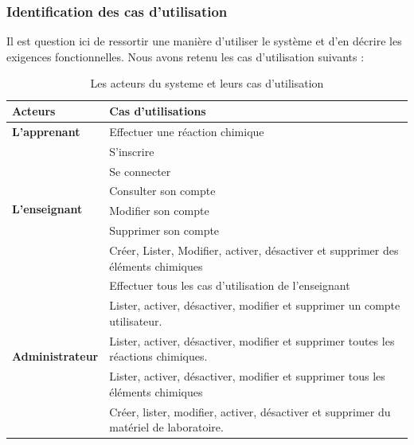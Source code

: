 \subsubsection{Identification des cas d’utilisation}

Il est question ici de ressortir une manière d’utiliser le système et d’en décrire les exigences fonctionnelles. Nous avons retenu les cas d’utilisation suivants :

\begin{table}[H]
	\centering
	\caption{Les acteurs du systeme et leurs cas d'utilisation}
	\label{tab:my-table}
	\begin{tabular}{|l|p{10cm}|}
		\hline
		\textbf{Acteurs}                         & \textbf{Cas d’utilisations}                                                           \\ \hline
		\textbf{L’apprenant}                     & Effectuer une réaction chimique                                                       \\ \hline
		\multirow{6}{*}{\textbf{L’enseignant}}   & S’inscrire                                                                            \\ \cline{2-2}
		                                         & Se connecter                                                                          \\ \cline{2-2}
		                                         & Consulter son compte                                                                  \\ \cline{2-2}
		                                         & Modifier son compte                                                                   \\ \cline{2-2}
		                                         & Supprimer son compte                                                                  \\ \cline{2-2}
		                                         & Créer, Lister, Modifier, activer, désactiver et supprimer des éléments chimiques      \\ \hline
		\multirow{5}{*}{\textbf{Administrateur}} & Effectuer tous les cas d’utilisation de l’enseignant                                  \\ \cline{2-2}
		                                         & Lister, activer, désactiver, modifier et supprimer un compte utilisateur.             \\ \cline{2-2}
		                                         & Lister, activer, désactiver, modifier et supprimer toutes les réactions chimiques.    \\ \cline{2-2}
		                                         & Lister, activer, désactiver, modifier et supprimer tous les éléments chimiques        \\ \cline{2-2}
		                                         & Créer, lister, modifier, activer, désactiver et supprimer du matériel de laboratoire. \\ \hline
	\end{tabular}
\end{table}

